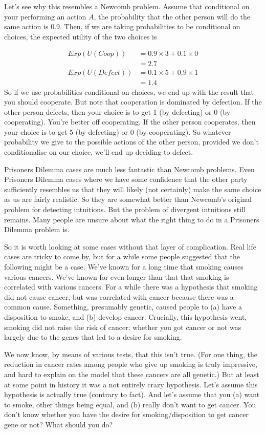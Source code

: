 Let's see why this resembles a Newcomb problem. Assume that conditional on your performing an action $A$, the probability that the other person will do the same action is 0.9. Then, if we are taking probabilities to be conditional on choices, the expected utility of the two choices is

\begin{align*}
Exp(U(Coop)) &= 0.9 \times 3 + 0.1 \times 0 \\
  &= 2.7 \\
 Exp(U(Defect)) &= 0.1 \times 5 + 0.9 \times 1 \\
  &= 1.4
 \end{align*}
So if we use probabilities conditional on choices, we end up with the result that you should cooperate. But note that cooperation is dominated by defection. If the other person defects, then your choice is to get 1 (by defecting) or 0 (by cooperating). You're better off cooperating. If the other person cooperates, then your choice is to get 5 (by defecting) or 0 (by cooperating). So whatever probability we give to the possible actions of the other person, provided we don't conditionalise on our choice, we'll end up deciding to defect.

Prisoners Dilemma cases are much less fantastic than Newcomb problems. Even Prisoners Dilemma cases where we have some confidence that the other party sufficiently resembles us that they will likely (not certainly) make the same choice as us are fairly realistic. So they are somewhat better than Newcomb's original problem for detecting intuitions. But the problem of divergent intuitions still remains. Many people are unsure about what the right thing to do in a Prisoners Dilemma problem is. 

So it is worth looking at some cases without that layer of complication. Real life cases are tricky to come by, but for a while some people suggested that the following might be a case. We've known for a long time that smoking causes various cancers. We've known for even longer than that that smoking is correlated with various cancers. For a while there was a hypothesis that smoking did not cause cancer, but was correlated with cancer because there was a common cause. Something, presumably genetic, caused people to (a) have a disposition to smoke, and (b) develop cancer. Crucially, this hypothesis went, smoking did not raise the risk of cancer; whether you got cancer or not was largely due to the genes that led to a desire for smoking.

We now know, by means of various tests, that this isn't true. (For one thing, the reduction in cancer rates among people who give up smoking is truly impressive, and hard to explain on the model that these cancers are all genetic.) But at least at some point in history it was a not entirely crazy hypothesis. Let's assume this hypothesis is actually true (contrary to fact). And let's assume that you (a) want to smoke, other things being equal, and (b) really don't want to get cancer. You don't know whether you have the desire for smoking/disposition to get cancer gene or not? What should you do?

